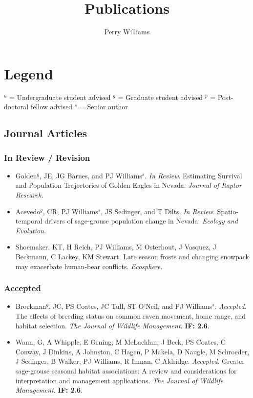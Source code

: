 \title{Publications}
\author{Perry Williams}
\date{}

\maketitle

\section*{Legend}
$^u$ = Undergraduate student advised \quad
$^g$ = Graduate student advised \quad
$^p$ = Post-doctoral fellow advised \quad
$^s$ = Senior author

\subsection*{Journal Articles}

\subsubsection*{In Review / Revision}
\begin{itemize}
\item Golden$^g$, JE, JG Barnes, and PJ Williams$^s$. \emph{In Review}. Estimating Survival and Population Trajectories of Golden Eagles in Nevada. \emph{Journal of Raptor Research}.
\item Acevedo$^g$, CR, PJ Williams$^s$, JS Sedinger, and T Dilts. \emph{In Review}. Spatio-temporal drivers of sage-grouse population change in Nevada. \emph{Ecology and Evolution}.
\item Shoemaker, KT, H Reich, PJ Williams, M Osterhout, J Vasquez, J Beckmann, C Lackey, KM Stewart. Late season frosts and changing snowpack may exacerbate human-bear conflicts. \emph{Ecosphere}.
\end{itemize}

\subsubsection*{Accepted}
\begin{itemize}
\item Brockman$^g$, JC, PS Coates, JC Tull, ST O'Neil, and PJ Williams$^s$. \emph{Accepted}. The effects of breeding status on common raven movement, home range, and habitat selection. \emph{The Journal of Wildlife Management}. \textbf{IF: 2.6}.
\item Wann, G, A Whipple, E Orning, M McLachlan, J Beck, PS Coates, C Conway, J Dinkins, A Johnston, C Hagen, P Makela, D Naugle, M Schroeder, J Sedinger, B Walker, PJ Williams, R Inman, C Aldridge. \emph{Accepted}. Greater sage-grouse seasonal habitat associations: A review and considerations for interpretation and management applications. \emph{The Journal of Wildlife Management}. \textbf{IF: 2.6}.
\end{itemize}


